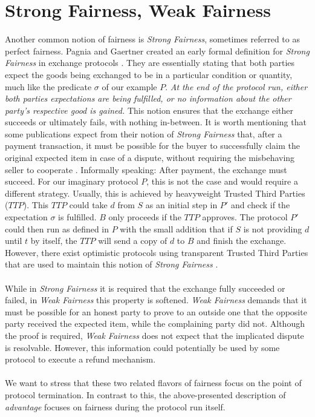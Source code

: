 \documentclass{cacthesis}
\newcounter{protocol}
\begin{document}
        \section{Strong Fairness, Weak Fairness}
        Another common notion of fairness is \textit{Strong Fairness}, sometimes referred to as perfect fairness. Pagnia and Gaertner created an early formal definition for \textit{Strong Fairness} in exchange protocols \cite{Pagnia99onthe}. They are essentially stating that both parties expect the goods being exchanged to be in a particular condition or quantity, much like the predicate $\sigma$ of our example $P$. \textit{At the end of the protocol run, either both parties expectations are being fulfilled, or no information about the other party's respective good is gained.} This notion ensures that the exchange either succeeds or ultimately fails, with nothing in-between.
        It is worth mentioning that some publications expect from their notion of \textit{Strong Fairness} that, after a payment transaction, it must be possible for the buyer to successfully claim the original expected item in case of a dispute, without requiring the misbehaving seller to cooperate \cite{10.1007/3-540-36552-4_31}. Informally speaking: After payment, the exchange must succeed. For our imaginary protocol $P$, this is not the case and would require a different strategy. Usually, this is achieved by heavyweight Trusted Third Parties ($TTP$). This $TTP$ could take $d$ from $S$ as an initial step in $P'$ and check if the expectation $\sigma$ is fulfilled. $B$ only proceeds if the $TTP$ approves. The protocol $P'$ could then run as defined in $P$ with the small addition that if $S$ is not providing $d$ until $t$ by itself, the $TTP$ will send a copy of $d$ to $B$ and finish the exchange. However, there exist optimistic protocols using transparent Trusted Third Parties that are used to maintain this notion of \textit{Strong Fairness} \cite{10.1007/3-540-36552-4_31} \cite{6982058}. \\\\
        While in \textit{Strong Fairness} it is required that the exchange fully succeeded or failed, in \textit{Weak Fairness} this property is softened. 
        \textit{Weak Fairness} demands that it must be possible for an honest party to prove to an outside one that the opposite party received the expected item, while the complaining party did not. Although the proof is required, \textit{Weak Fairness} does not expect that the implicated dispute is resolvable. However, this information could potentially be used by some protocol to execute a refund mechanism. \\\\
        We want to stress that these two related flavors of fairness focus on the point of protocol termination. In contrast to this, the above-presented description of \textit{advantage} focuses on fairness during the protocol run itself.
        
\end{document}
